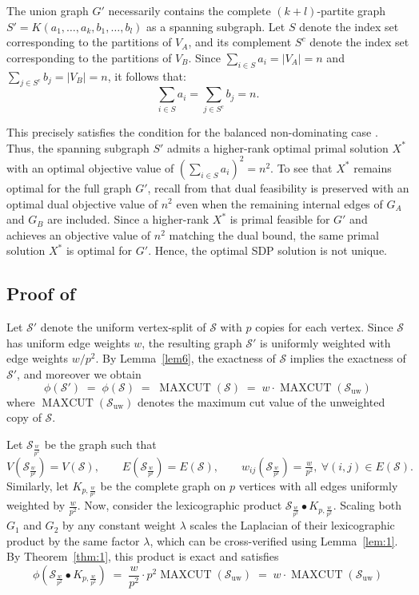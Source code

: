 \documentclass[a4paper,fleqn]{cas-sc}
\newcommand{\1}{\mathbf{1}}
\DeclareMathOperator{\mc}{MAXCUT}
\newcommand*{\myQED}{\hfill \scalebox{0.59}{\fbox{\rule{0.08mm}{0pt}\rule{0pt}{1.3mm}}}}%
\begin{document}
The union graph $G'$ necessarily contains the complete $(k+l)$-partite graph $S' = K(a_1, \dots, a_k, b_1, \dots, b_l)$ as a spanning subgraph. Let $S$ denote the index set corresponding to the partitions of $V_A$, and its complement $S^c$ denote the index set corresponding to the partitions of $V_B$. Since $\sum_{i \in S} a_i = |V_A| = n$ and $\sum_{j \in S^c} b_j = |V_B| = n$, it follows that:
\[
\sum_{i \in S} a_i = \sum_{j \in S^c} b_j = n.
\]

This precisely satisfies the condition for the balanced non-dominating case . Thus, the spanning subgraph $S'$ admits a higher-rank optimal primal solution $X^*$ with an optimal objective value of $\left(\sum_{i \in S} a_i\right)^2 = n^2$. To see that $X^*$ remains optimal for the full graph $G'$, recall from  that dual feasibility is preserved with an optimal dual objective value of $n^2$ even when the remaining internal edges of $G_A$ and $G_B$ are included. Since a higher-rank $X^*$ is primal feasible for $G'$ and achieves an objective value of $n^2$ matching the dual bound, the same primal solution $X^*$ is optimal for $G'$. Hence, the optimal SDP solution is not unique. \hfill \myQED


\subsection{Proof of } 
\label{proof:prop5}
Let $\mathcal{S}'$ denote the uniform vertex-split of $\mathcal{S}$ with $p$ copies for each vertex. Since $\mathcal{S}$ has uniform edge weights $w$, the resulting graph $\mathcal{S'}$ is uniformly weighted with edge weights $w/p^{2}$. By Lemma~\ref{lem6}, the exactness of $\mathcal{S}$ implies the exactness of $\mathcal{S}'$, and moreover we obtain 
\begin{equation*}
 \phi(\mathcal{S}') \;=\; \phi(\mathcal S) \;=\; \mc(\mathcal{S}) \;=\; w \cdot \mc(\mathcal{S}_{\mathrm{uw}})   
\end{equation*}
where $\mc(\mathcal{S}_{\mathrm{uw}})$ denotes the maximum cut value of the unweighted copy of $\mathcal{S}$.

Let $\mathcal{S}_{\tfrac{w}{p^2}}$ be the graph such that
\[
V(\mathcal{S}_{\tfrac{w}{p^2}}) = V(\mathcal{S}), 
\qquad 
E(\mathcal{S}_{\tfrac{w}{p^2}}) = E(\mathcal{S}), 
\qquad
w_{ij}(\mathcal{S}_{\tfrac{w}{p^2}}) = \tfrac{w}{p^2}, \ \forall (i,j) \in E(\mathcal{S}).
\]
Similarly, let $K_{p,\tfrac{w}{p^2}}$ be the complete graph on $p$ vertices with all edges uniformly weighted by $\tfrac{w}{p^2}$. Now, consider the lexicographic product $\mathcal{S}_{\tfrac{w}{p^2}} \bullet K_{p,\tfrac{w}{p^2}}$. Scaling both $G_1$ and $G_2$ by any constant weight $\lambda$ scales the Laplacian of their lexicographic product by the same factor $\lambda$, which can be cross-verified using Lemma~\ref{lem:1}. By Theorem~\ref{thm:1}, this product is exact and satisfies 
\begin{equation*}
 \phi\left(\mathcal{S}_{\tfrac{w}{p^2}} \bullet K_{p,\tfrac{w}{p^2}}\right) \;=\; \frac{w}{p^2} \cdot p^{2} \mc(\mathcal{S}_{\mathrm{uw}}) \;=\; w \cdot \mc(\mathcal{S}_{\mathrm{uw}})   
\end{equation*}
\end{document}
